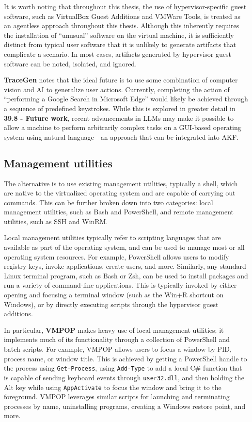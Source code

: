 It is worth noting that throughout this thesis, the use of
hypervisor-specific guest software, such as VirtualBox Guest Additions
and VMWare Tools, is treated as an agentless approach throughout this
thesis. Although this inherently requires the installation of
``unusual'' software on the virtual machine, it is sufficiently distinct
from typical user software that it is unlikely to generate artifacts
that complicate a scenario. In most cases, artifacts generated by
hypervisor guest software can be noted, isolated, and ignored.

\textbf{TraceGen} notes that the ideal future is to use some combination
of computer vision and AI to generalize user actions. Currently,
completing the action of ``performing a Google Search in Microsoft
Edge'' would likely be achieved through a sequence of predefined
keystrokes. While this is explored in greater detail in \textbf{39.8 -
Future work}, recent advancements in LLMs may make it possible to allow
a machine to perform arbitrarily complex tasks on a GUI-based operating
system using natural language - an approach that can be integrated into
AKF.

\subsection{Management utilities}\label{management-utilities}

The alternative is to use existing management utilities, typically a
shell, which are native to the virtualized operating system and are
capable of carrying out commands. This can be further broken down into
two categories: local management utilities, such as Bash and PowerShell,
and remote management utilities, such as SSH and WinRM.

Local management utilities typically refer to scripting languages that
are available as part of the operating system, and can be used to manage
most or all operating system resources. For example, PowerShell allows
users to modify registry keys, invoke applications, create users, and
more. Similarly, any standard Linux terminal program, such as Bash or
Zsh, can be used to install packages and run a variety of command-line
applications. This is typically invoked by either opening and focusing a
terminal window (such as the Win+R shortcut on Windows), or by directly
executing scripts through the hypervisor guest additions.

In particular, \textbf{VMPOP} makes heavy use of local management
utilities; it implements much of its functionality through a collection
of PowerShell and batch scripts. For example, VMPOP allows users to
focus a window by PID, process name, or window title. This is achieved
by getting a PowerShell handle to the process using
\texttt{Get-Process}, using \texttt{Add-Type} to add a local C\#
function that is capable of sending keyboard events through
\texttt{user32.dll}, and then holding the Alt key while using
\texttt{AppActivate} to focus the window and bring it to the foreground.
VMPOP leverages similar scripts for launching and terminating processes
by name, uninstalling programs, creating a Windows restore point, and
more.

